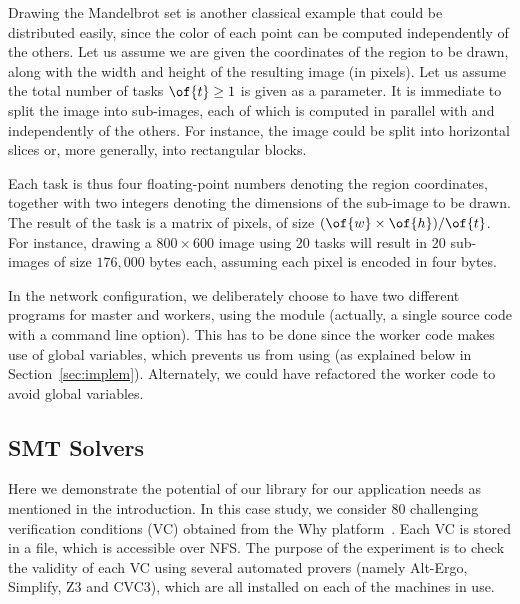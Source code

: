 \documentclass[a4paper,12pt]{article}
\begin{document}
Drawing the Mandelbrot set is another classical example that could be
distributed easily, since the color of each point can be computed
independently of the others. 
Let us assume we are given the coordinates of the region to be drawn,
along with the width  and height  of the resulting image
(in pixels). 
Let us assume the total number of tasks $\of{t} \ge 1$ is given as a
parameter. It is immediate to split the image into  sub-images,
each of which is computed in parallel with and independently of the
others. For instance, the image could be split into horizontal slices
or, more generally, into rectangular blocks.

Each task is thus four floating-point numbers denoting the region
coordinates, together with two integers denoting the dimensions of the
sub-image to be drawn. The result of the task is a matrix of pixels,
of size $(\of{w}\times\of{h}) / \of{t}$. 
For instance, drawing a $800\times 600$ image using 20 tasks will
result in 20 sub-images of size $176,000$ bytes each,
assuming each pixel is encoded in four bytes.

In the network configuration, we deliberately choose to have two
different programs for master and workers, using the 
module (actually, a single source code with a command line option).
This has to be done since the worker code makes use of global
variables, which prevents us from using
 (as explained below in Section~\ref{sec:implem}). 
Alternately, we could have refactored the worker
code to avoid global variables.


\subsection{SMT Solvers}\label{sec:SMT}

Here we demonstrate the potential of our library for our application
needs as mentioned in the introduction. In this case study,
we consider 80 challenging verification conditions
(VC) obtained from the Why platform~\cite{filliatre07cav}.  Each
VC is stored in a file, which is accessible over
NFS. The purpose of the experiment is to check the validity of each VC
using several automated provers (namely Alt-Ergo, Simplify, Z3 and CVC3),
which are all installed on each of the machines in use.
\end{document}
